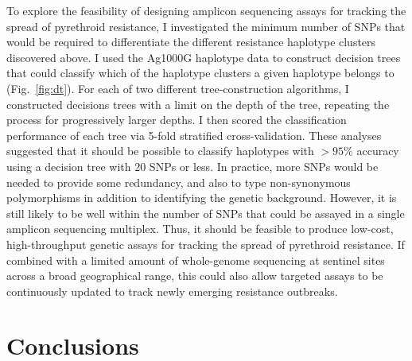 \documentclass[a4paper,11pt,abstracton,hidelinks]{scrartcl}
\begin{document}
To explore the feasibility of designing amplicon sequencing assays for tracking the spread of pyrethroid resistance, I investigated the minimum number of SNPs that would be required to differentiate the different resistance haplotype clusters discovered above.
%
I used the Ag1000G haplotype data to construct decision trees that could classify which of the haplotype clusters a given haplotype belongs to (Fig.~\ref{fig:dt}).
%
For each of two different tree-construction algorithms, I constructed decisions trees with a limit on the depth of the tree, repeating the process for progressively larger depths.
%
I then scored the classification performance of each tree via 5-fold stratified cross-validation.
%
These analyses suggested that it should be possible to classify haplotypes with $>95\%$ accuracy using a decision tree with 20 SNPs or less.
%
In practice, more SNPs would be needed to provide some redundancy, and also to type non-synonymous polymorphisms in addition to identifying the genetic background.
%
However, it is still likely to be well within the number of SNPs that could be assayed in a single amplicon sequencing multiplex.
%
Thus, it should be feasible to produce low-cost, high-throughput genetic assays for tracking the spread of pyrethroid resistance.
%
If combined with a limited amount of whole-genome sequencing at sentinel sites across a broad geographical range, this could also allow targeted assays to be continuously updated to track newly emerging resistance outbreaks.



\section{Conclusions}\label{sec:conclusions}
\end{document}
